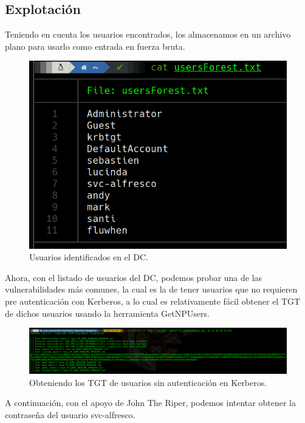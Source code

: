 \documentclass{article}
\begin{document}
\subsection{Explotación}

Teniendo en cuenta los usuarios encontrados, los almacenamos en un archivo plano para usarlo como entrada en fuerza bruta.

\begin{figure}[H]
	\center
	\includegraphics[width=\textwidth/2]{images/forest/archivo_userForest.txt.png}
	\caption{Usuarios identificados en el DC.}
\end{figure}

Ahora, con el listado de usuarios del DC, podemos probar una de las vulnerabilidades más comunes, la cual es la de tener usuarios que no requieren pre autenticación con Kerberos, a lo cual es relativamente fácil obtener el TGT de dichos usuarios usando la herramienta GetNPUsers.

\begin{figure}[H]
	\center
	\includegraphics[width=\textwidth]{images/forest/ticket-NPUsers-.png}
	\caption{Obteniendo los TGT de usuarios sin autenticación en Kerberos.}
\end{figure}

A continuación, con el apoyo de John The Riper, podemos intentar obtener la contraseña del usuario svc-alfresco.
\end{document}
